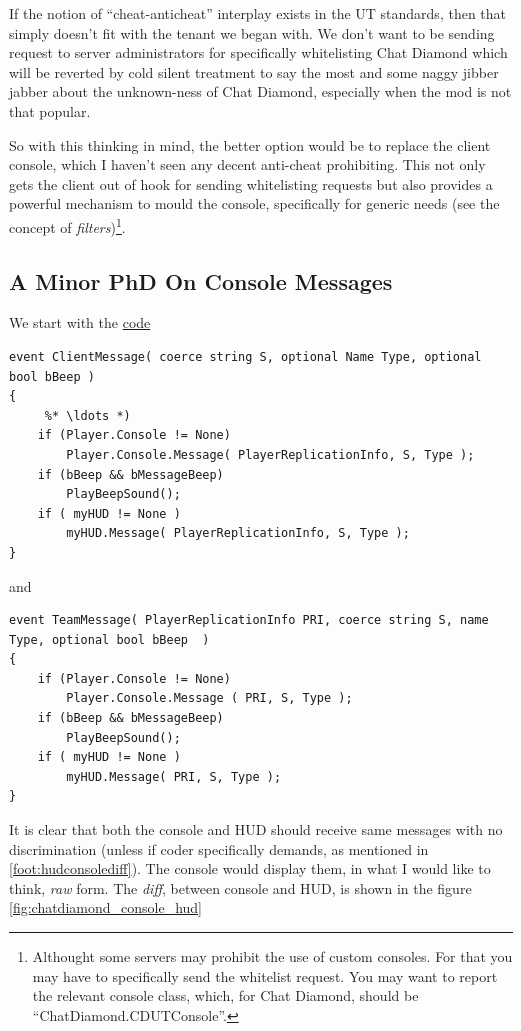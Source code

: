 \documentclass{article}
\theoremstyle{definition}
\begin{document}
If the notion of ``cheat-anticheat'' interplay exists in the UT standards, then that simply doesn't fit with the tenant we began with.  We don't want to be sending request to server administrators for specifically whitelisting Chat Diamond which will be reverted by cold silent treatment to say the most and some naggy jibber jabber about the unknown-ness of Chat Diamond, especially when the mod is not that popular.

So with this thinking in mind, the better option would be to replace the client console, which I haven't seen any decent anti-cheat prohibiting. This not only gets the client out of hook for sending whitelisting requests but also provides a powerful mechanism to mould the console, specifically for generic needs (see the concept of \emph{filters})\footnote{Althought some servers may prohibit the use of custom consoles.  For that you may have to specifically send the whitelist request. You may want to report the relevant console class, which, for Chat Diamond, should be ``ChatDiamond.CDUTConsole''.}.

\subsection{A Minor PhD On Console Messages}

We start with the \href{http://uncodex.ut-files.com/UT/v436/Source_engine/playerpawn.html}{code} 

\begin{lstlisting}[frame=single]
event ClientMessage( coerce string S, optional Name Type, optional bool bBeep )
{
     %* \ldots *)    
    if (Player.Console != None)
        Player.Console.Message( PlayerReplicationInfo, S, Type );
    if (bBeep && bMessageBeep)
        PlayBeepSound();
    if ( myHUD != None )
        myHUD.Message( PlayerReplicationInfo, S, Type );
}       
\end{lstlisting}
and
\begin{lstlisting}[frame=single]
event TeamMessage( PlayerReplicationInfo PRI, coerce string S, name Type, optional bool bBeep  )
{
    if (Player.Console != None)
        Player.Console.Message ( PRI, S, Type );
    if (bBeep && bMessageBeep)
        PlayBeepSound();
    if ( myHUD != None )
        myHUD.Message( PRI, S, Type );
}     
\end{lstlisting}

It is clear that both the console and HUD should receive same messages with no discrimination (unless if coder specifically demands, as mentioned in \ref{foot:hudconsolediff}).  The console would display them, in what I would like to think, \emph{raw} form.  The \emph{diff}, between console and HUD, is shown in the figure \ref{fig:chatdiamond_console_hud}
\end{document}
